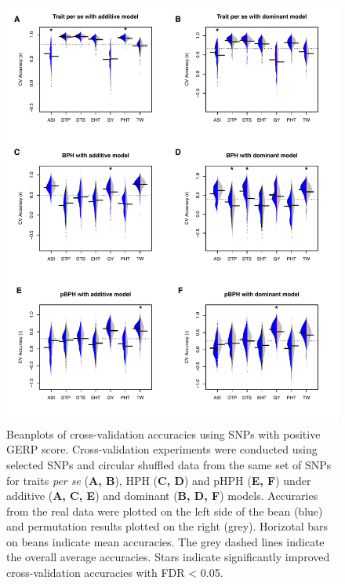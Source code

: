 \documentclass[9pt,twocolumn,twoside]{gsajnl}
\begin{document}
\begin{figure}[htbp]
\centering
\includegraphics[width=\linewidth]{Figure_gerpall.pdf}
\caption{Beanplots of cross-validation accuracies using SNPs with positive GERP score. Cross-validation experiments were conducted using selected SNPs and circular shuffled data from the same set of SNPs for traits \emph{per se} (\textbf{A, B}), HPH (\textbf{C, D}) and pHPH (\textbf{E, F}) under additive (\textbf{A, C, E}) and dominant (\textbf{B, D, F}) models. Accuraries from the real data were plotted on the left side of the bean (blue) and permutation results plotted on the right (grey). Horizotal bars on beans indicate mean accuracies. The grey dashed lines indicate the overall average accuracies. Stars indicate significantly improved cross-validation accuracies with FDR < 0.05.}
\label{fig:gerpall}
\end{figure}
\end{document}
